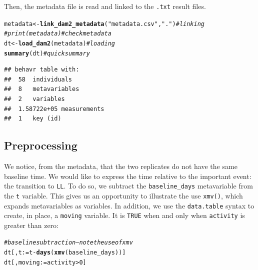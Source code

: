 \documentclass[10pt,letterpaper]{article}\usepackage[]{graphicx}\usepackage[]{color}
\makeatletter
\newcommand{\hlnum}[1]{\textcolor[rgb]{0.686,0.059,0.569}{#1}}%
\newcommand{\hlstr}[1]{\textcolor[rgb]{0.192,0.494,0.8}{#1}}%
\newcommand{\hlcom}[1]{\textcolor[rgb]{0.678,0.584,0.686}{\textit{#1}}}%
\newcommand{\hlopt}[1]{\textcolor[rgb]{0,0,0}{#1}}%
\newcommand{\hlstd}[1]{\textcolor[rgb]{0.345,0.345,0.345}{#1}}%
\newcommand{\hlkwb}[1]{\textcolor[rgb]{0.69,0.353,0.396}{#1}}%
\newcommand{\hlkwd}[1]{\textcolor[rgb]{0.737,0.353,0.396}{\textbf{#1}}}%
\newenvironment{kframe}{%
 \def\at@end@of@kframe{}%
 \ifinner\ifhmode%
  \def\at@end@of@kframe{\end{minipage}}%
  \begin{minipage}{\columnwidth}%
 \fi\fi%
 \def\FrameCommand##1{\hskip\@totalleftmargin \hskip-\fboxsep
 \colorbox{shadecolor}{##1}\hskip-\fboxsep
     \hskip-\linewidth \hskip-\@totalleftmargin \hskip\columnwidth}%
 \MakeFramed {\advance\hsize-\width
   \@totalleftmargin\z@ \linewidth\hsize
   \@setminipage}}%
 {\par\unskip\endMakeFramed%
 \at@end@of@kframe}
\newenvironment{knitrout}{}{} %
\makeatother
\begin{document}
Then, the metadata file is read and linked to the \texttt{.txt} result files.

\begin{knitrout}
\color{fgcolor}\begin{kframe}
\begin{alltt}
\hlstd{metadata} \hlkwb{<-} \hlkwd{link_dam2_metadata}\hlstd{(}\hlstr{"metadata.csv"}\hlstd{,}\hlstr{"."}\hlstd{)}    \hlcom{# linking}
\hlcom{# print(metadata)                                     # check metadata}
\hlstd{dt} \hlkwb{<-} \hlkwd{load_dam2}\hlstd{(metadata)}                             \hlcom{# loading}
\hlkwd{summary}\hlstd{(dt)}                                           \hlcom{# quick summary}
\end{alltt}
\begin{verbatim}
## behavr table with:
##  58	individuals
##  8	metavariables
##  2	variables
##  1.58722e+05	measurements
##  1	key (id)
\end{verbatim}
\end{kframe}
\end{knitrout}

\subsection*{Preprocessing}
We notice, from the metadata, that the two replicates do not have the same baseline time.
We would like to express the time relative to the important event: the transition to \texttt{LL}. 
To do so, we subtract the \texttt{baseline\_days} metavariable from the \texttt{t} variable.
This gives us an opportunity to illustrate the use \texttt{xmv()}, which expands metavariables as variables.
In addition, we use the \texttt{data.table} syntax to create, in place, a \texttt{moving} variable.
It is \texttt{TRUE} when and only when \texttt{activity} is greater than zero:

\begin{knitrout}
\color{fgcolor}\begin{kframe}
\begin{alltt}
\hlcom{# baseline subtraction -- note the use of xmv}
\hlstd{dt[,t} \hlkwb{:=} \hlstd{t} \hlopt{-} \hlkwd{days}\hlstd{(}\hlkwd{xmv}\hlstd{(baseline_days))]}
\hlstd{dt[, moving} \hlkwb{:=}  \hlstd{activity} \hlopt{>} \hlnum{0}\hlstd{]}
\end{alltt}
\end{kframe}
\end{knitrout}
\end{document}
